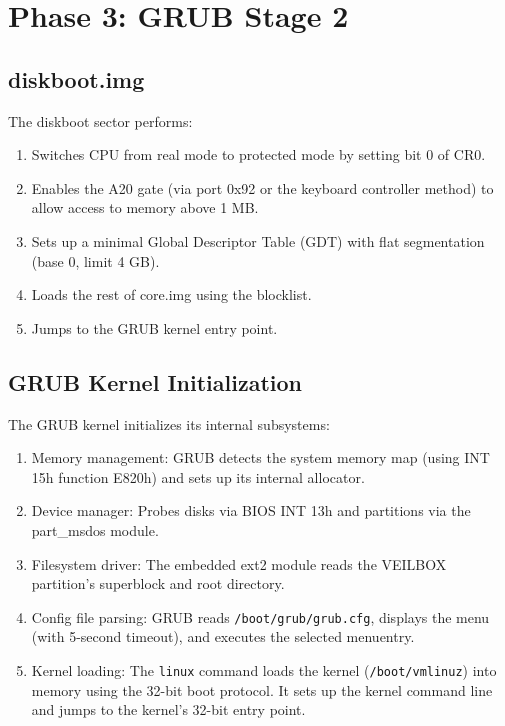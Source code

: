 \section{Phase 3: GRUB Stage 2}

\subsection{diskboot.img}

The diskboot sector performs:

\begin{enumerate}[nosep]
  \item Switches CPU from real mode to protected mode by setting bit 0
        of CR0.
  \item Enables the A20 gate (via port 0x92 or the keyboard controller
        method) to allow access to memory above 1 MB.
  \item Sets up a minimal Global Descriptor Table (GDT) with flat
        segmentation (base 0, limit 4 GB).
  \item Loads the rest of core.img using the blocklist.
  \item Jumps to the GRUB kernel entry point.
\end{enumerate}

\subsection{GRUB Kernel Initialization}

The GRUB kernel initializes its internal subsystems:

\begin{enumerate}[nosep]
  \item Memory management: GRUB detects the system memory map (using
        INT 15h function E820h) and sets up its internal allocator.
  \item Device manager: Probes disks via BIOS INT 13h and partitions
        via the part\_msdos module.
  \item Filesystem driver: The embedded ext2 module reads the VEILBOX
        partition's superblock and root directory.
  \item Config file parsing: GRUB reads \texttt{/boot/grub/grub.cfg},
        displays the menu (with 5-second timeout), and executes the
        selected menuentry.
  \item Kernel loading: The \texttt{linux} command loads the kernel
        (\texttt{/boot/vmlinuz}) into memory using the 32-bit boot
        protocol. It sets up the kernel command line and jumps to the
        kernel's 32-bit entry point.
\end{enumerate}

